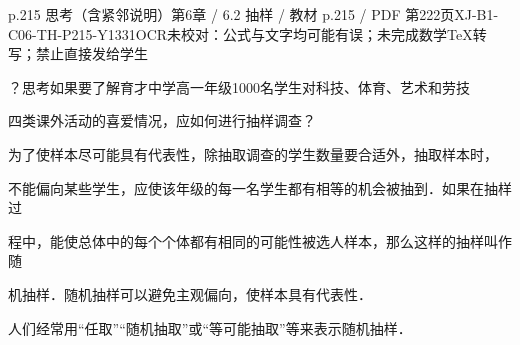 \begin{bankitem}{p.215 思考（含紧邻说明）}{第6章 / 6.2 抽样 / 教材 p.215 / PDF 第222页}{XJ-B1-C06-TH-P215-Y1331}{OCR未校对：公式与文字均可能有误；未完成数学TeX转写；禁止直接发给学生}
\begin{ocrdraft}
\par
？思考如果要了解育才中学高一年级1000名学生对科技、体育、艺术和劳技
\par
四类课外活动的喜爱情况，应如何进行抽样调查？
\par
为了使样本尽可能具有代表性，除抽取调查的学生数量要合适外，抽取样本时，
\par
不能偏向某些学生，应使该年级的每一名学生都有相等的机会被抽到．如果在抽样过
\par
程中，能使总体中的每个个体都有相同的可能性被选人样本，那么这样的抽样叫作随
\par
机抽样．随机抽样可以避免主观偏向，使样本具有代表性．
\par
人们经常用“任取”“随机抽取”或“等可能抽取”等来表示随机抽样．
\end{ocrdraft}
\end{bankitem}
